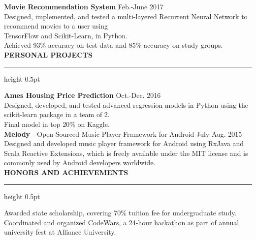 \documentclass[a4paper]{article}
\newcommand{\myline}{\par
  \kern2pt %
  \hrule height 0.5pt
  \kern2pt %
}
\newcommand{\mybullet}{
	\indent \textbullet \hspace*{2mm}
}
\begin{document}
        \noindent
        \textbf{Movie Recommendation System} \hfill Feb.-June 2017\\
        \mybullet Designed, implemented, and tested a multi-layered Recurrent Neural Network 
        to recommend movies to a user using \\ \indent\indent TensorFlow and Scikit-Learn, 
        in Python. \\
        \mybullet Achieved 93\% accuracy on test data and 85\% accuracy on study groups. \\

	\noindent
	{\large \textbf{PERSONAL PROJECTS}}
	\myline 
	\smallskip
	
	\noindent
	\textbf{Ames Housing Price Prediction} \hfill Oct.-Dec. 2016 \\
	\mybullet Designed, developed, and tested advanced regression models in Python using 
        the scikit-learn package in a team of 2. \\
	\mybullet Final model in top 20\% on Kaggle. \\
	
	\noindent
	\textbf{Melody} - Open-Sourced Music Player Framework for Android \hfill July-Aug. 2015 \\
	\mybullet Designed and developed music player framework for Android using RxJava and 
        Scala Reactive Extensions, which is freely \indent\indent available under the MIT license 
        and is commonly used by Android developers worldwide. \\
	
	\noindent
	{\large \textbf{HONORS AND ACHIEVEMENTS}}
	\myline 
	\smallskip

        \mybullet Awarded state scholarship, covering 70\% tuition fee for undergraduate study. \\
        \mybullet Coordinated and organized CodeWars, a 24-hour hackathon as part of annual 
        university fest at Alliance University. \\
		
	
\end{document}
